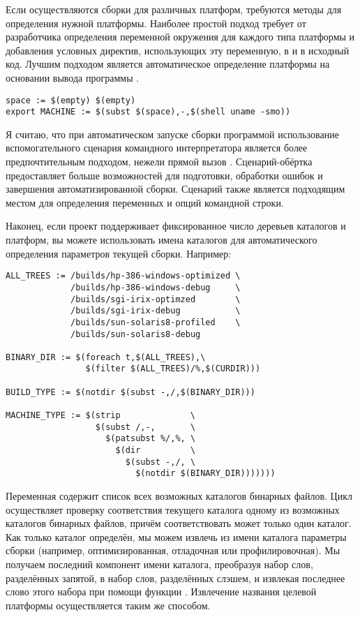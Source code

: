 Если осуществляются сборки для различных платформ, требуются методы
для определения нужной платформы. Наиболее простой подход требует от
разработчика определения переменной окружения для каждого типа
платформы и добавления условных директив, использующих эту переменную,
в \Makefile{} и в исходный код. Лучшим подходом является
автоматическое определение платформы на основании вывода программы
.

{\footnotesize
\begin{verbatim}
space := $(empty) $(empty)
export MACHINE := $(subst $(space),-,$(shell uname -smo))
\end{verbatim}
}

Я считаю, что при автоматическом запуске сборки программой
 использование вспомогательного сценария командного
интерпретатора является более предпочтительным подходом, нежели прямой
вызов \GNUmake{}. Сценарий-обёртка предоставляет больше возможностей
для подготовки, обработки ошибок и завершения автоматизированной
сборки. Сценарий также является подходящим местом для определения
переменных и опций командной строки.

Наконец, если проект поддерживает фиксированное число деревьев
каталогов и платформ, вы можете использовать имена каталогов для
автоматического определения параметров текущей сборки. Например:

{\footnotesize
\begin{verbatim}
ALL_TREES := /builds/hp-386-windows-optimized \
             /builds/hp-386-windows-debug     \
             /builds/sgi-irix-optimzed        \
             /builds/sgi-irix-debug           \
             /builds/sun-solaris8-profiled    \
             /builds/sun-solaris8-debug

BINARY_DIR := $(foreach t,$(ALL_TREES),\
                $(filter $(ALL_TREES)/%,$(CURDIR)))

BUILD_TYPE := $(notdir $(subst -,/,$(BINARY_DIR)))

MACHINE_TYPE := $(strip              \
                  $(subst /,-,       \
                    $(patsubst %/,%, \
                      $(dir          \
                        $(subst -,/, \
                          $(notdir $(BINARY_DIR)))))))
\end{verbatim}
}

Переменная  содержит список всех возможных
каталогов бинарных файлов. Цикл  осуществляет
проверку соответствия текущего каталога одному из возможных каталогов
бинарных файлов, причём соответствовать может только один каталог. Как
только каталог определён, мы можем извлечь из имени каталога параметры
сборки (например, оптимизированная, отладочная или профилировочная).
Мы получаем последний компонент имени каталога, преобразуя набор слов,
разделённых запятой, в набор слов, разделённых слэшем, и извлекая
последнее слово этого набора при помощи функции .
Извлечение названия целевой платформы осуществляется таким же
способом.
